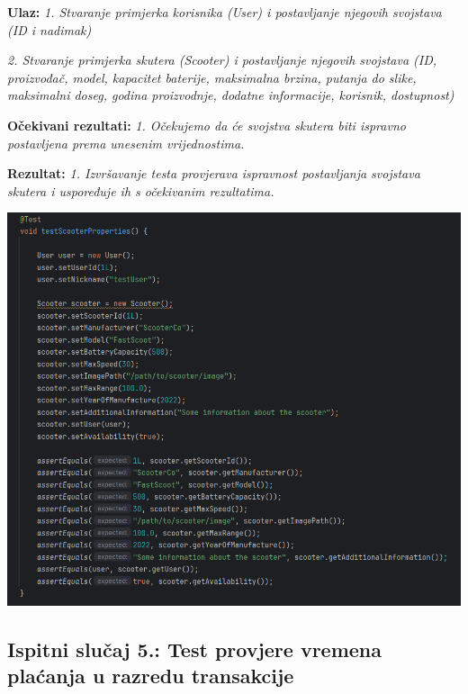                                                             \textbf{Ulaz:}
                                                            \textit{1. Stvaranje primjerka korisnika (User) i postavljanje njegovih svojstava (ID i nadimak)}

                                                            \textit{2. Stvaranje primjerka skutera (Scooter) i postavljanje njegovih svojstava (ID, proizvođač, model, kapacitet baterije, maksimalna brzina, putanja do slike, maksimalni doseg, godina proizvodnje, dodatne informacije, korisnik, dostupnost)}

                                                            \textbf{Očekivani rezultati:}
                                                            \textit{1. Očekujemo da će svojstva skutera biti ispravno postavljena prema unesenim vrijednostima.}

                                                            \textbf{Rezultat:}
                                                            \textit{1. Izvršavanje testa provjerava ispravnost postavljanja svojstava skutera i uspoređuje ih s očekivanim rezultatima.}

            \includegraphics[width=1\linewidth]{slike/ScooterTest.png}

			\subsection{Ispitni slučaj 5.: Test provjere vremena plaćanja u razredu transakcije}

